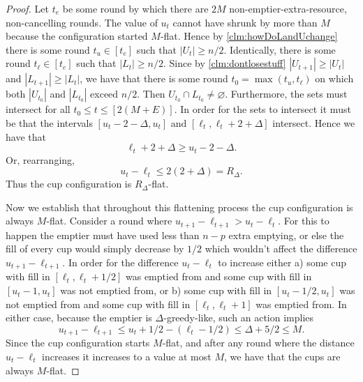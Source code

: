 \begin{proof}
  Let $t_e$ be some round by which there are $2M$
  non-emptier-extra-resource, non-cancelling rounds. The value of
  $u_t$ cannot have shrunk by more than $M$ because the
  configuration started $M$-flat. Hence by
  \cref{clm:howDoLandUchange} there is some round $t_u \in [t_e]$
  such that $|U_t|\ge n/2$. Identically, there is some round
  $t_\ell \in [t_e]$ such that $|L_t| \ge n/2$. Since by
  \cref{clm:dontlosestuff} $|U_{t+1}|\ge |U_t|$ and $|L_{t+1}|
  \ge |L_t|$, we have that there is some round $t_0 =\max(t_u,
  t_\ell)$ on which both $|U_{t_0}|$ and $|L_{t_0}|$ exceed
  $n/2$. Then $U_{t_0} \cap L_{t_0} \neq \varnothing$.
  Furthermore, the sets must intersect for all $t_0 \le t \le
  [2(M+E)]$. In order for the sets to intersect it must be that
  the intervals $[u_t-2-\Delta, u_t]$ and $[\ell_t,
  \ell_t+2+\Delta]$ intersect. Hence we have that
  $$\ell_t+2+\Delta \ge u_t-2-\Delta.$$ 
  Or, rearranging, 
  $$u_t - \ell_t \le 2(2+\Delta) = R_\Delta.$$ 
  Thus the cup configuration is $R_\Delta$-flat.

  Now we establish that throughout this flattening process the cup
  configuration is always $M$-flat. Consider a round where
  $u_{t+1} - \ell_{t+1} > u_t - \ell_t$. For this to happen the
  emptier must have used less than $n-p$ extra emptying, or else
  the fill of every cup would simply decrease by $1/2$ which
  wouldn't affect the difference $u_{t+1} - \ell_{t+1}$.
  In order for the difference $u_t - \ell_t$ to 
  increase either a) some cup with fill in $[\ell_t, \ell_t + 1/2]$ was
  emptied from and some cup with fill in $[u_t-1, u_t]$ was not
  emptied from, or b) some cup with fill in $[u_t-1/2, u_t]$ was
  not emptied from and some cup with fill in $[\ell_t, \ell_t+1]$ was
  emptied from. In either case, because the emptier is
  $\Delta$-greedy-like, such an action implies
  $$u_{t+1} - \ell_{t+1} \le u_t +1/2 - (\ell_t -1/2)  \le \Delta + 5/2 \le M.$$
  Since the cup configuration starts $M$-flat, and after any
  round where the distance $u_t-\ell_t$ increases it increases to
  a value at most $M$, we have that the cups are always $M$-flat.
\end{proof}


